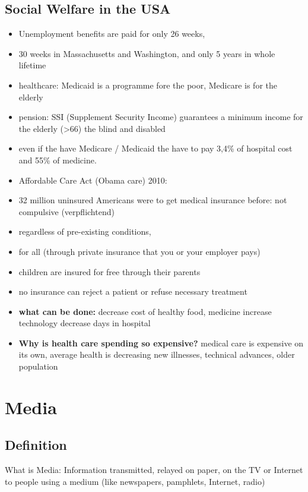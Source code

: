 \documentclass[a5paper,12pt,twoside,titlepage]{scrartcl}
\begin{document}
\subsection{Social Welfare in the USA}
\begin{itemize}
	\item Unemployment benefits are paid for only 26 weeks, 
	\item 30 weeks in Massachusetts and Washington, and only 5 years in whole lifetime
	\item healthcare: Medicaid is a programme fore the poor, Medicare is for the elderly
	\item pension: SSI (Supplement Security Income) guarantees a minimum income for the elderly (>66) the blind and disabled
	\item even if the have Medicare / Medicaid the have to pay 3,4\% of hospital cost and 55\% of medicine.
	\item Affordable Care Act (Obama care) 2010:
	\item 32 million uninsured Americans were to get medical insurance \textrightarrow before: not compulsive (verpflichtend)
	\item \textrightarrow regardless of pre-existing conditions, 
	\item \textrightarrow for all (through private insurance that you or your employer pays)
	\item \textrightarrow children are insured for free through their parents
	\item \textrightarrow no insurance can reject a patient or refuse necessary treatment 
	\item \textbf{what can be done:}
	\subitem decrease cost of healthy food, medicine
	\subitem increase technology
	\subitem decrease days in hospital
	\item \textbf{Why is health care spending so expensive?}
	\subitem medical care is expensive on its own, 
	\subitem average health is decreasing
	\subitem new illnesses, technical advances, older population
\end{itemize}


\section{Media}
\subsection{Definition}
	What is \glqq Media\grqq : Information transmitted, relayed on paper, on the TV or Internet to people using a medium (like newspapers, pamphlets, Internet, radio)
\end{document}
